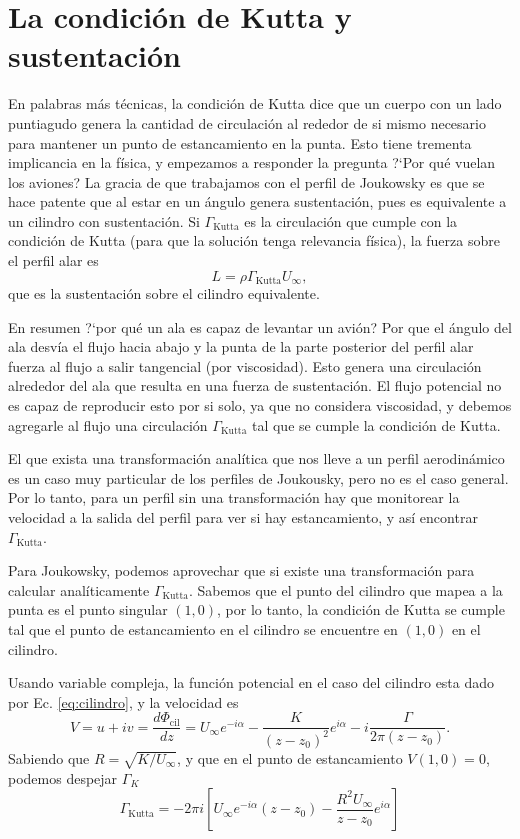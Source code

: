 \section*{La condición de Kutta y sustentación}

En palabras más técnicas, la condición de Kutta dice que un cuerpo con un lado puntiagudo genera la cantidad de circulación al rededor de si mismo necesario para mantener un punto de estancamiento en la punta.
Esto tiene trementa implicancia en la física, y empezamos a responder la pregunta \mbox{?`}Por qué vuelan los aviones?
La gracia de que trabajamos con el perfil de Joukowsky es que se hace patente que al estar en un ángulo genera sustentación, pues es equivalente a un cilindro con sustentación.
Si $\Gamma_\text{Kutta}$ es la circulación que cumple con la condición de Kutta (para que la solución tenga relevancia física), la fuerza sobre el perfil alar es
%
\begin{equation}
L = \rho\Gamma_\text{Kutta}U_\infty,
\end{equation}
%
que es la sustentación sobre el cilindro equivalente.

En resumen \mbox{?`}por qué un ala es capaz de levantar un avión? Por que el ángulo del ala desvía el flujo hacia abajo y la punta de la parte posterior del perfil alar fuerza al flujo a salir tangencial (por viscosidad).
Esto genera una circulación alrededor del ala que resulta en una fuerza de sustentación.
El flujo potencial no es capaz de reproducir esto por si solo, ya que no considera viscosidad, y debemos agregarle al flujo una circulación $\Gamma_\text{Kutta}$ tal que se cumple la condición de Kutta.

El que exista una transformación analítica que nos lleve a un perfil aerodinámico es un caso muy particular de los perfiles de Joukousky, pero no es el caso general. 
Por lo tanto, para un perfil sin una transformación hay que monitorear la velocidad a la salida del perfil para ver si hay estancamiento, y así encontrar $\Gamma_\text{Kutta}$.

Para Joukowsky, podemos aprovechar que si existe una transformación para calcular analíticamente $\Gamma_\text{Kutta}$. 
Sabemos que el punto del cilindro que mapea a la punta es el punto singular $(1,0)$, por lo tanto, la condición de Kutta se cumple tal que el punto de estancamiento en el cilindro se encuentre en $(1,0)$ en el cilindro.

Usando variable compleja, la función potencial en el caso del cilindro esta dado por Ec. \eqref{eq:cilindro}, y la velocidad es
%
\begin{equation}
V = u+iv = \frac{d\Phi_\text{cil}}{dz} = U_\infty e^{-i\alpha} - \frac{K}{(z-z_0)^2}e^{i\alpha} - i\frac{\Gamma}{2\pi(z-z_0)}.
\end{equation}
%
Sabiendo que $R = \sqrt{K/U_\infty}$, y que en el punto de estancamiento $V(1,0)=0$, podemos despejar $\Gamma_K$
%
\begin{equation}
\Gamma_\text{Kutta} = -2\pi i\left[ U_\infty e^{-i\alpha}(z-z_0) - \frac{R^2U_\infty}{z-z_0}e^{i\alpha}\right]
\end{equation}

